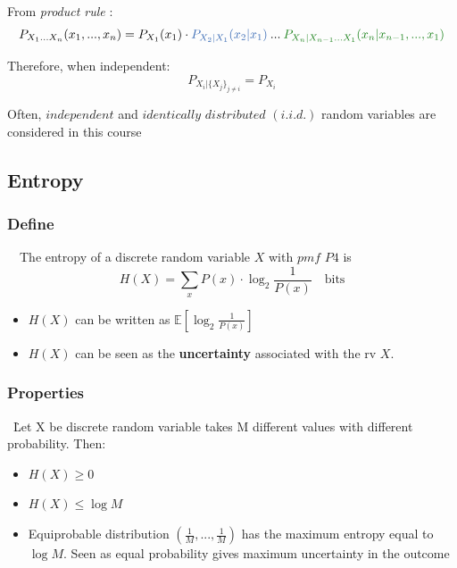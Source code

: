 \documentclass[12pt]{article}
\begin{document}
From \textit{product rule} :
$$ P_{X_1...X_n}(x_1,..., x_n) =  P_{X_1}(x_1)\cdot \textcolor{blue1}{P_{X_2|X_1}(x_2|x_1)}\: ... \:\textcolor{green}{ P_{X_n|X_{n-1}...X_1}(x_n|x_{n-1},...,x_1) } $$

Therefore, when independent:
$$ P_{X_i|\{X_j\}_{j \neq i}} = P_{X_i}$$

Often, $independent$ and $identically$ $distributed$ $(i.i.d.)$ random variables are considered in this course 

\subsection{Entropy}
\subsubsection{Define}
\quad \ \, The entropy of a discrete random variable $X$ with $pmf$ $P4$ is 
$$ H(X) = \sum_xP(x)\cdot \log_2 \frac{1}{P(x)}\quad \textrm{bits}$$
\begin{itemize}
\item $H(X)$ can be written as $\mathbb{E}[\log_2 \frac{1}{P(x)}] $
\item $H(X)$ can be seen as the \textcolor{blue1}{\textbf{uncertainty}} associated with the rv $X$.
\end{itemize}
\subsubsection{Properties}
\quad \ \. Let X be discrete random variable takes M different values with different probability. Then:
\begin{itemize}
\item $H(X) \ge 0$

\item $H(X)\le \log M$

\item Equiprobable distribution $(\frac{1}{M},...,\frac{1}{M}) $ has the maximum entropy equal to $\log M$. Seen as equal probability gives maximum uncertainty in the outcome

\end{itemize}
\end{document}
